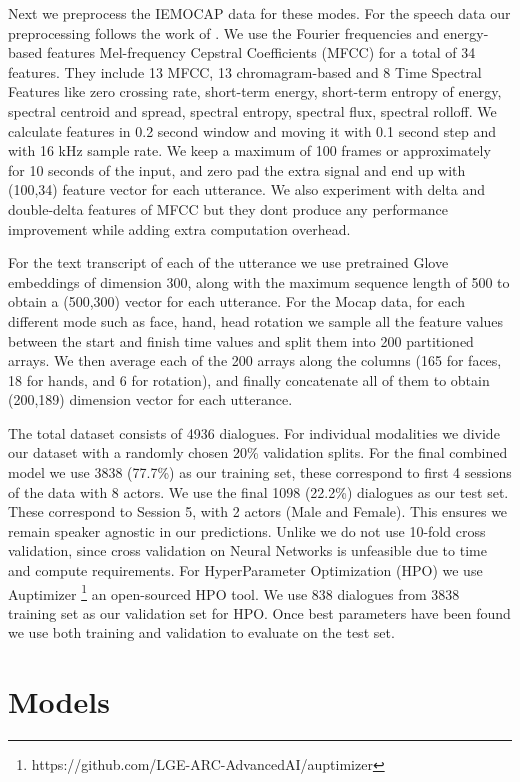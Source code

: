 \documentclass{article}
\begin{document}
Next we preprocess the IEMOCAP data for these modes. For the speech data our preprocessing follows the work of \cite{Chernykh}. We use the Fourier frequencies and energy-based features Mel-frequency Cepstral Coefficients (MFCC) for a total of 34 features. They include 13 MFCC, 13 chromagram-based and 8 Time Spectral Features like zero crossing rate, short-term energy, short-term entropy of energy, spectral centroid and spread, spectral entropy, spectral flux, spectral rolloff. We calculate features in 0.2 second window and moving it with 0.1 second step and with 16 kHz sample rate. We keep a maximum of 100 frames or approximately for 10 seconds of the input, and zero pad the extra signal and end up with (100,34) feature vector for each utterance. We also experiment with delta and double-delta features of MFCC but they dont produce any performance improvement while adding extra computation overhead.

For the text transcript of each of the utterance we use pretrained Glove embeddings \cite{Penn} of dimension 300, along with the maximum sequence length of 500 to obtain a (500,300) vector for each utterance. For the Mocap data, for each different mode such as face, hand, head rotation we sample all the feature values between the start and finish time values and split them into 200 partitioned arrays. We then average each of the 200 arrays along the columns (165 for faces, 18 for hands, and 6 for rotation), and finally concatenate all of them to obtain (200,189) dimension vector for each utterance. 

The total dataset consists of 4936 dialogues. For individual modalities we divide our dataset with a randomly chosen 20\% validation splits. For the final combined model we use 3838 (77.7\%) as our training set, these correspond to first 4 sessions of the data with 8 actors. We use the final 1098 (22.2\%) dialogues as our test set. These correspond to Session 5, with 2 actors (Male and Female). This ensures we remain speaker agnostic in our predictions. Unlike \cite{poria2018multimodal} we do not use 10-fold cross validation, since cross validation on Neural Networks is unfeasible due to time and compute requirements. For HyperParameter Optimization (HPO) we use Auptimizer  \footnote{https://github.com/LGE-ARC-AdvancedAI/auptimizer} an open-sourced HPO tool. We use 838 dialogues from 3838 training set as our validation set for HPO. Once best parameters have been found we use both training and validation to evaluate on the test set. 


\section{Models}
\label{sec:models}
\end{document}
